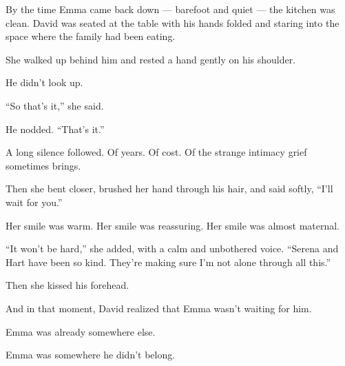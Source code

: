 By the time Emma came back down --- barefoot and quiet --- the kitchen was clean.
David was seated at the table with his hands folded and staring into the space where the
family had been eating.

She walked up behind him and rested a hand gently on his shoulder.

He didn’t look up.

``So that’s it,'' she said.

He nodded. ``That’s it.''

A long silence followed. Of years. Of cost. Of the strange intimacy grief sometimes brings.

Then she bent closer, brushed her hand through his hair, and said softly,  
``I’ll wait for you.''

Her smile was warm. Her smile was reassuring. Her smile was almost maternal.  

``It won’t be hard,'' she added, with a calm and unbothered voice.
``Serena and Hart have been so kind. They’re making sure I’m not alone through all this.''

Then she kissed his forehead.

And in that moment, David realized that 
Emma wasn’t waiting for him.  

Emma was already somewhere else.  

Emma was somewhere he didn't belong.

\medskip

